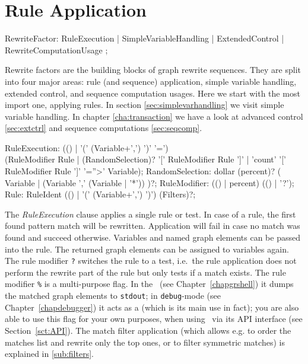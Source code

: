 \section{Rule Application} \label{sec:ruleapplication}

\begin{rail} 
  RewriteFactor: RuleExecution
     | SimpleVariableHandling
     | ExtendedControl
     | RewriteComputationUsage
	; 
\end{rail}

Rewrite factors are the building blocks of graph rewrite sequences.
They are split into four major areas: rule (and sequence) application, simple variable handling, extended control, and sequence computation usages.
Here we start with the most import one, applying rules.
In section \ref{sec:simplevarhandling} we visit simple variable handling.
In chapter \ref{cha:transaction} we have a look at advanced control \ref{sec:extctrl} and sequence computations \ref{sec:seqcomp}.

\begin{rail}
  RuleExecution: (() | '(' (Variable+',') ')' '=') \\ (RuleModifier Rule | (RandomSelection)? '[' RuleModifier Rule ']' | 'count' '[' RuleModifier Rule ']' '=''>' Variable);
  RandomSelection: dollar (percent)? ( Variable | (Variable ',' (Variable | '*')) )?;
  RuleModifier: (() | percent) (() | '?');
  Rule: RuleIdent (() | '(' (Variable+',') ')') (Filters)?;
\end{rail}

The \emph{RuleExecution} clause applies a single rule or test.
In case of a rule, the first found pattern match will be rewritten.
Application will fail in case no match was found and succeed otherwise. 
Variables and named graph elements can be passed into the rule.
The returned graph elements can be assigned to variables again.
The rule modifier \texttt{?} switches the rule to a test, i.e.\ the rule application does not perform the rewrite part of the rule but only tests if a match exists.
The rule modifier \texttt{\%} is a multi-purpose flag. 
In the \GrShell\ (see Chapter~\ref{chapgrshell}) it dumps the matched graph elements to \texttt{stdout};
in \texttt{debug}-mode (see Chapter~\ref{chapdebugger}) it acts as a  (which is its main use in fact);
you are also able to use this flag for your own purposes, when using \GrG\ via its API interface (see Section~\ref{sct:API}).
The match filter application (which allows e.g. to order the matches list and rewrite only the top ones, or to filter symmetric matches) is explained in \ref{sub:filters}.

